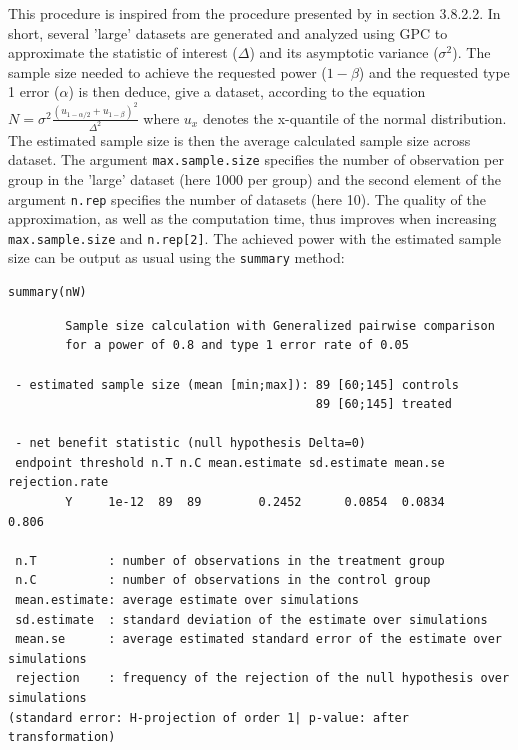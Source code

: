 \documentclass[12pt]{article}
\begin{document}
This procedure is inspired from the procedure presented by
\cite{brunner2018rank} in section 3.8.2.2. In short, several 'large'
datasets are generated and analyzed using GPC to approximate the
statistic of interest (\(\Delta\)) and its asymptotic variance
(\(\sigma^2\)). The sample size needed to achieve the requested power
(\(1-\beta\)) and the requested type 1 error (\(\alpha\)) is then
deduce, give a dataset, according to the equation \(N = \sigma^2
\frac{\left(u_{1-\alpha/2}+u_{1-\beta}\right)^2}{\Delta^2}\) where
\(u_x\) denotes the x-quantile of the normal distribution. The
estimated sample size is then the average calculated sample size
across dataset. The argument \texttt{max.sample.size} specifies the number of
observation per group in the 'large' dataset (here 1000 per group) and
the second element of the argument \texttt{n.rep} specifies the number of
datasets (here 10). The quality of the approximation, as well as the
computation time, thus improves when increasing \texttt{max.sample.size} and
\texttt{n.rep[2]}. The achieved power with the estimated sample size can be
output as usual using the \texttt{summary} method:
\lstset{language=r,label= ,caption= ,captionpos=b,numbers=none}
\begin{lstlisting}
summary(nW)
\end{lstlisting}

\begin{verbatim}
        Sample size calculation with Generalized pairwise comparison
        for a power of 0.8 and type 1 error rate of 0.05 

 - estimated sample size (mean [min;max]): 89 [60;145] controls
                                           89 [60;145] treated

 - net benefit statistic (null hypothesis Delta=0)
 endpoint threshold n.T n.C mean.estimate sd.estimate mean.se rejection.rate
        Y     1e-12  89  89        0.2452      0.0854  0.0834          0.806

 n.T          : number of observations in the treatment group
 n.C          : number of observations in the control group
 mean.estimate: average estimate over simulations
 sd.estimate  : standard deviation of the estimate over simulations
 mean.se      : average estimated standard error of the estimate over simulations
 rejection    : frequency of the rejection of the null hypothesis over simulations
(standard error: H-projection of order 1| p-value: after transformation)
\end{verbatim}

\clearpage
\end{document}
